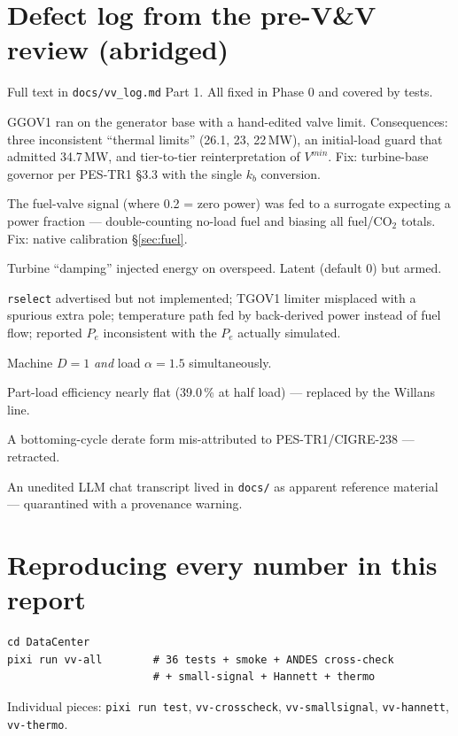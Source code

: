 \documentclass[11pt]{article}
\begin{document}
\appendix
\section{Defect log from the pre-V\&V review (abridged)}
\label{app:defects}

Full text in \texttt{docs/vv\_log.md} Part 1. All fixed in Phase 0 and
covered by tests.
\begin{description}[nosep]
\item[G1 (per-unit bases)] GGOV1 ran on the generator base with a
  hand-edited valve limit. Consequences: three inconsistent ``thermal
  limits'' (26.1, 23, 22\,MW), an initial-load guard that admitted
  34.7\,MW, and tier-to-tier reinterpretation of $V^{min}$. Fix:
  turbine-base governor per PES-TR1 \S3.3 with the single $k_b$
  conversion.
\item[G2 (fuel mapping)] The fuel-valve signal (where 0.2 = zero power)
  was fed to a surrogate expecting a power fraction --- double-counting
  no-load fuel and biasing all fuel/CO$_2$ totals. Fix: native
  calibration \S\ref{sec:fuel}.
\item[G3 ($D_m$ sign)] Turbine ``damping'' injected energy on overspeed.
  Latent (default 0) but armed.
\item[G4 (structure)] \texttt{rselect} advertised but not implemented;
  TGOV1 limiter misplaced with a spurious extra pole; temperature path
  fed by back-derived power instead of fuel flow; reported $P_e$
  inconsistent with the $P_e$ actually simulated.
\item[G5 (damping double-count)] Machine $D=1$ \emph{and} load
  $\alpha=1.5$ simultaneously.
\item[P1 (LM9000 efficiency)] Part-load efficiency nearly flat (39.0\,\%
  at half load) --- replaced by the Willans line.
\item[P4 (citations)] A bottoming-cycle derate form mis-attributed to
  PES-TR1/CIGRE-238 --- retracted.
\item[Process] An unedited LLM chat transcript lived in \texttt{docs/} as
  apparent reference material --- quarantined with a provenance warning.
\end{description}

\section{Reproducing every number in this report}
\begin{verbatim}
cd DataCenter
pixi run vv-all        # 36 tests + smoke + ANDES cross-check
                       # + small-signal + Hannett + thermo
\end{verbatim}
Individual pieces: \texttt{pixi run test}, \texttt{vv-crosscheck},
\texttt{vv-smallsignal}, \texttt{vv-hannett}, \texttt{vv-thermo}.
\end{document}
